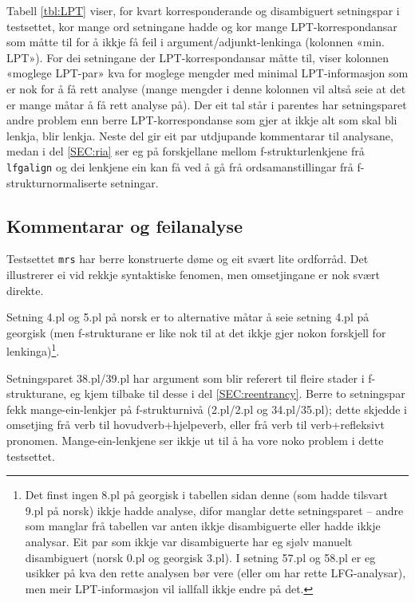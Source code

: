 \documentclass[12pt,a4paper,oneside,draft]{report}
\begin{document}
Tabell \ref{tbl:LPT} viser, for kvart korresponderande og disambiguert
setningspar i testsettet, kor mange ord setningane hadde og kor mange
LPT\hyp{}korrespondansar som måtte til for å ikkje få feil i
argument/adjunkt-lenkinga (kolonnen «min. LPT»). For dei setningane
der LPT\hyp{}korrespondansar måtte til, viser kolonnen «moglege LPT-par»
kva for moglege mengder med minimal LPT\hyp{}informasjon som er nok for å
få rett analyse (mange mengder i denne kolonnen vil altså seie at det
er mange måtar å få rett analyse på).  Der eit tal står i parentes har
setningsparet andre problem enn berre LPT\hyp{}korrespondanse som gjer at
ikkje alt som skal bli lenkja, blir lenkja. Neste del gir eit par
utdjupande kommentarar til analysane, medan i del \ref{SEC:ria} ser eg
på forskjellane mellom f\hyp{}strukturlenkjene frå \texttt{lfgalign} og dei
lenkjene ein kan få ved å gå frå ordsamanstillingar frå
f\hyp{}strukturnormaliserte setningar.

\subsection{Kommentarar og feilanalyse}
\label{sec-5.3.1}

\label{SEC:feilanalyse}

Testsettet \texttt{mrs} har berre konstruerte døme og eit svært lite
 ordforråd. Det illustrerer ei vid rekkje syntaktiske fenomen, men
 omsetjingane er nok svært direkte.

Setning 4.pl og 5.pl på norsk er to alternative måtar å seie setning
 4.pl på georgisk (men f\hyp{}strukturane er like nok til at det ikkje gjer
 nokon forskjell for lenkinga)\footnote{Det finst ingen 8.pl på georgisk i tabellen sidan denne (som
        hadde tilsvart 9.pl på norsk) ikkje hadde analyse, difor
        manglar dette setningsparet -- andre som manglar frå tabellen
        var anten ikkje disambiguerte eller hadde ikkje analysar. Eit
        par som ikkje var disambiguerte har eg sjølv manuelt
        disambiguert (norsk 0.pl og georgisk 3.pl). I setning 57.pl og
        58.pl er eg usikker på kva den rette analysen bør vere (eller
        om har rette LFG-analysar), men meir LPT\hyp{}informasjon vil
        iallfall ikkje endre på det. }.

Setningsparet 38.pl/39.pl har argument som blir referert til fleire
 stader i f\hyp{}strukturane, eg kjem tilbake til desse i del
 \ref{SEC:reentrancy}. Berre to setningspar fekk mange-ein-lenkjer på
 f\hyp{}strukturnivå (2.pl/2.pl og 34.pl/35.pl); dette skjedde i omsetjing
 frå verb til hovudverb+hjelpeverb, eller frå verb til verb+refleksivt
 pronomen. Mange-ein-lenkjene ser ikkje ut til å ha vore noko problem
 i dette testsettet.
\end{document}
